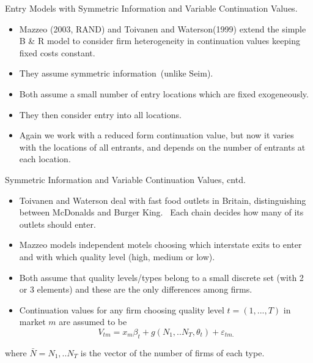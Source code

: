 \begin{frame}{Entry Models with Symmetric Information and Variable
Continuation Values.}
\begin{itemize}
\item Mazzeo (2003, RAND) and Toivanen and Waterson(1999) extend the simple
B \& R model to consider firm heterogeneity in continuation values keeping
fixed costs constant.
\item They assume symmetric information\ (unlike Seim).
\item Both assume a small number of entry locations which are fixed
exogeneously.
\item They then consider entry into all locations.
\item Again we work with a reduced form continuation value, but now it
varies with the locations of all entrants, and depends on the number of
entrants at each location.
\end{itemize}
\end{frame}

\begin{frame}{Symmetric Information and Variable Continuation Values,
cntd.}
\begin{itemize}
\item Toivanen and Waterson deal with fast food outlets in Britain,
distinguishing between McDonalds and Burger King. \ Each chain decides how
many of its outlets should enter.
\item Mazzeo models independent motels choosing which interstate exits to
enter and with which quality level (high, medium or low).
\item Both assume that quality levels/types belong to a small discrete set
(with 2 or 3 elements) and these are the only differences among firms.
\item Continuation values for any firm choosing quality level $t=(1,...,T)$
in market $m$ are assumed to be 
\begin{equation*}
V_{tm}=x_{m}\beta _{t}+g(N_{1},..N_{T},\theta _{t})+\varepsilon _{tm.}
\end{equation*}
\end{itemize}
where $\bar{N}=N_{1},..N_{T}$ is the vector of the number of firms of each
type.
\end{frame}

